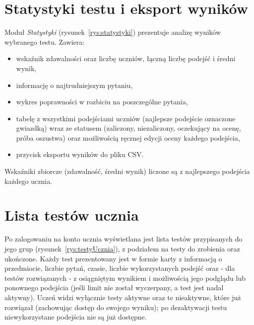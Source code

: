 \section{Statystyki testu i eksport wyników}
\label{sec:statystyki}

Moduł \emph{Statystyki} (rysunek~\ref{rys:statystyki}) prezentuje analizę wyników wybranego testu.
Zawiera:

\begin{itemize}
  \item wskaźnik zdawalności oraz liczbę uczniów, łączną liczbę podejść i średni wynik,
  \item informację o najtrudniejszym pytaniu,
  \item wykres poprawności w rozbiciu na poszczególne pytania,
  \item tabelę z wszystkimi podejściami uczniów (najlepsze podejście oznaczone gwiazdką) wraz ze
        statusem (zaliczony, niezaliczony, oczekujący na ocenę, próba oszustwa) oraz możliwością
        ręcznej edycji oceny każdego podejścia,
  \item przycisk eksportu wyników do pliku CSV.
\end{itemize}

Wskaźniki zbiorcze (zdawalność, średni wynik) liczone są z najlepszego podejścia każdego ucznia.


\section{Lista testów ucznia}
\label{sec:testyUcznia}

Po zalogowaniu na konto ucznia wyświetlana jest lista testów przypisanych do jego grup
(rysunek~\ref{rys:testyUcznia}), z podziałem na testy do zrobienia oraz ukończone. Każdy test
prezentowany jest w formie karty z informacją o przedmiocie, liczbie pytań, czasie, liczbie
wykorzystanych podejść oraz - dla testów rozwiązanych - z osiągniętym wynikiem i możliwością jego
podglądu lub ponownego podejścia (jeśli limit nie został wyczerpany, a test jest nadal aktywny).
Uczeń widzi wyłącznie testy aktywne oraz te nieaktywne, które już rozwiązał (zachowując dostęp do
swojego wyniku); po dezaktywacji testu niewykorzystane podejścia nie są już dostępne.


